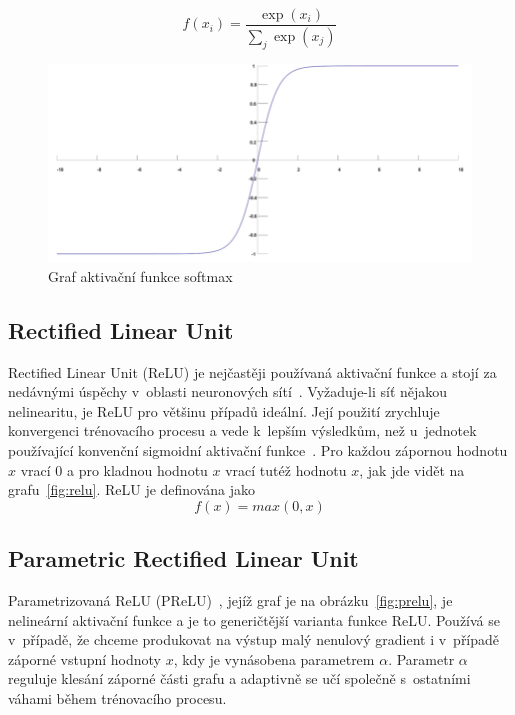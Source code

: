\begin{equation}
  f(x_i) = \frac{\exp(x_i)}{\sum_j \exp(x_j)}
\end{equation}


\begin{figure}[H]
    \centering
    \includegraphics[scale=0.35]{obrazky-figures/softmax.png}
    \caption{\label{fig:softmax}Graf aktivační funkce softmax}
\end{figure}



\subsection*{Rectified Linear Unit}
\label{relu}
Rectified Linear Unit (ReLU) je nejčastěji používaná aktivační funkce a stojí za nedávnými úspěchy v~oblasti neuronových sítí~\cite{NIPS2012_4824}. Vyžaduje-li síť nějakou nelinearitu, je ReLU pro většinu případů ideální. Její použití zrychluje konvergenci trénovacího procesu a vede k~lepším výsledkům, než u~jednotek používající konvenční sigmoidní aktivační funkce~\cite{40811}. Pro každou zápornou hodnotu $x$ vrací $0$ a pro kladnou hodnotu $x$ vrací tutéž hodnotu $x$, jak jde vidět na grafu~\ref{fig:relu}. ReLU je definována jako 
\begin{equation}
   f(x)=max(0,x)
\end{equation}




\subsection*{Parametric Rectified Linear Unit}
Parametrizovaná ReLU (PReLU)~\cite{he2015delving}, jejíž graf je na obrázku~\ref{fig:prelu}, je nelineární aktivační funkce a je to generičtější varianta funkce ReLU. Používá se v~případě, že chceme produkovat na výstup malý nenulový gradient i v~případě záporné vstupní hodnoty $x$, kdy je vynásobena parametrem $\alpha$. Parametr $\alpha$ reguluje klesání záporné části grafu a adaptivně se učí společně s~ostatními váhami během trénovacího procesu.

